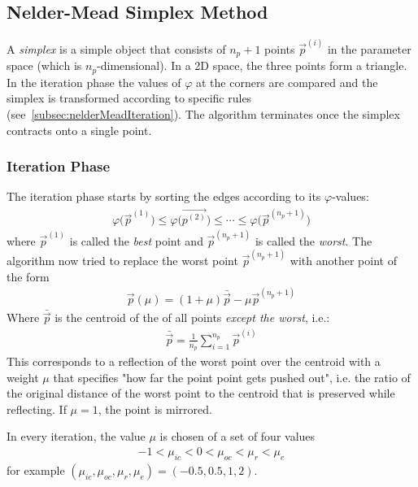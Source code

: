 		\subsection{Nelder-Mead Simplex Method}
			A \emph{simplex} is a simple object that consists of \( n_p + 1 \) points \( \vec{p}^{(i)} \) in the parameter space (which is \(n_p\)-dimensional). In a 2D space, the three points form a triangle. In the iteration phase the values of \(\varphi\) at the corners are compared and the simplex is transformed according to specific rules (see~\autoref{subsec:nelderMeadIteration}). The algorithm terminates once the simplex contracts onto a single point.

			\subsubsection{Iteration Phase}
				\label{subsec:nelderMeadIteration}
			
				The iteration phase starts by sorting the edges according to its \(\varphi\)-values:
				\begin{align*}
					\varphi\big(\vec{p}^{(1)}\big) \leq \varphi\big(\vec{p^{(2)}}\big) \leq \cdots \leq \varphi\big(\vec{p}^{(n_p + 1)}\big)
				\end{align*}
				where \( \vec{p}^{(1)} \) is called the \emph{best} point and \( \vec{p}^{(n_p + 1)} \) is called the \emph{worst}. The algorithm now tried to replace the worst point \( \vec{p}^{(n_p + 1)} \) with another point of the form
				\begin{align*}
					\vec{p}(\mu) = (1 + \mu) \bar{\vec{p}} - \mu \vec{p}^{(n_p + 1)}
				\end{align*}
				Where \(\bar{\vec{p}}\) is the centroid of the of all points \emph{except the worst}, i.e.:
				\begin{align*}
					\bar{\vec{p}} = \frac{1}{n_p} \sum_{i = 1}^{n_p} \vec{p}^{(i)}
				\end{align*}
				This corresponds to a reflection of the worst point over the centroid with a weight \(\mu\) that specifies "how far the point point gets pushed out", i.e. the ratio of the original distance of the worst point to the centroid that is preserved while reflecting. If \(\mu = 1\), the point is mirrored.
				
				In every iteration, the value \(\mu\) is chosen of a set of four values
				\begin{align*}
					-1 < \mu_{ic} < 0 < \mu_{oc} < \mu_{r} < \mu_{e}
				\end{align*}
				for example \( (\mu_{ic}, \mu_{oc}, \mu_r, \mu_\mathit{e}) = (-0.5, 0.5, 1, 2) \).

